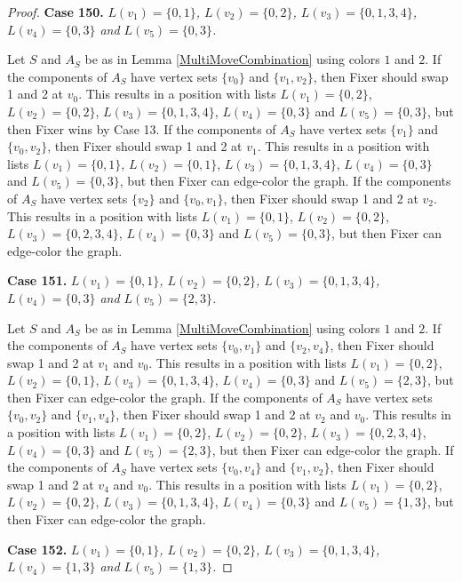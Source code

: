 \documentclass[12pt]{amsart}
\theoremstyle{plain}
\theoremstyle{definition}
\theoremstyle{remark}
\begin{document}
\begin{proof}
\noindent\textbf{Case 150.  }\textit{$L(v_1) = \{0, 1\}$, $L(v_2) = \{0, 2\}$, $L(v_3) = \{0, 1, 3, 4\}$, $L(v_4) = \{0, 3\}$ and $L(v_5) = \{0, 3\}$.}

Let $S$ and $A_S$ be as in Lemma \ref{MultiMoveCombination} using colors $1$ and $2$. If the components of $A_S$ have vertex sets $\{v_0\}$ and $\{v_1, v_2\}$, then Fixer should swap 1 and 2 at $v_0$. This results in a position with lists $L(v_1) = \{0, 2\}$, $L(v_2) = \{0, 2\}$, $L(v_3) = \{0, 1, 3, 4\}$, $L(v_4) = \{0, 3\}$ and $L(v_5) = \{0, 3\}$, but then Fixer wins by Case 13. If the components of $A_S$ have vertex sets $\{v_1\}$ and $\{v_0, v_2\}$, then Fixer should swap 1 and 2 at $v_1$. This results in a position with lists $L(v_1) = \{0, 1\}$, $L(v_2) = \{0, 1\}$, $L(v_3) = \{0, 1, 3, 4\}$, $L(v_4) = \{0, 3\}$ and $L(v_5) = \{0, 3\}$, but then Fixer can edge-color the graph. If the components of $A_S$ have vertex sets $\{v_2\}$ and $\{v_0, v_1\}$, then Fixer should swap 1 and 2 at $v_2$. This results in a position with lists $L(v_1) = \{0, 1\}$, $L(v_2) = \{0, 2\}$, $L(v_3) = \{0, 2, 3, 4\}$, $L(v_4) = \{0, 3\}$ and $L(v_5) = \{0, 3\}$, but then Fixer can edge-color the graph. 

\noindent\textbf{Case 151.  }\textit{$L(v_1) = \{0, 1\}$, $L(v_2) = \{0, 2\}$, $L(v_3) = \{0, 1, 3, 4\}$, $L(v_4) = \{0, 3\}$ and $L(v_5) = \{2, 3\}$.}

Let $S$ and $A_S$ be as in Lemma \ref{MultiMoveCombination} using colors $1$ and $2$. If the components of $A_S$ have vertex sets $\{v_0, v_1\}$ and $\{v_2, v_4\}$, then Fixer should swap 1 and 2 at $v_1$ and $v_0$. This results in a position with lists $L(v_1) = \{0, 2\}$, $L(v_2) = \{0, 1\}$, $L(v_3) = \{0, 1, 3, 4\}$, $L(v_4) = \{0, 3\}$ and $L(v_5) = \{2, 3\}$, but then Fixer can edge-color the graph. If the components of $A_S$ have vertex sets $\{v_0, v_2\}$ and $\{v_1, v_4\}$, then Fixer should swap 1 and 2 at $v_2$ and $v_0$. This results in a position with lists $L(v_1) = \{0, 2\}$, $L(v_2) = \{0, 2\}$, $L(v_3) = \{0, 2, 3, 4\}$, $L(v_4) = \{0, 3\}$ and $L(v_5) = \{2, 3\}$, but then Fixer can edge-color the graph. If the components of $A_S$ have vertex sets $\{v_0, v_4\}$ and $\{v_1, v_2\}$, then Fixer should swap 1 and 2 at $v_4$ and $v_0$. This results in a position with lists $L(v_1) = \{0, 2\}$, $L(v_2) = \{0, 2\}$, $L(v_3) = \{0, 1, 3, 4\}$, $L(v_4) = \{0, 3\}$ and $L(v_5) = \{1, 3\}$, but then Fixer can edge-color the graph. 

\noindent\textbf{Case 152.  }\textit{$L(v_1) = \{0, 1\}$, $L(v_2) = \{0, 2\}$, $L(v_3) = \{0, 1, 3, 4\}$, $L(v_4) = \{1, 3\}$ and $L(v_5) = \{1, 3\}$.}


\end{proof}
\end{document}
